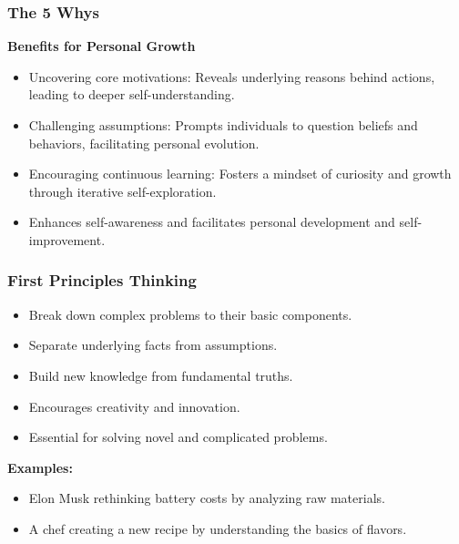 \begin{frame}[fragile]\frametitle{The 5 Whys}
\textbf{Benefits for Personal Growth}
\begin{itemize}
    \item Uncovering core motivations: Reveals underlying reasons behind actions, leading to deeper self-understanding.
    \item Challenging assumptions: Prompts individuals to question beliefs and behaviors, facilitating personal evolution.
    \item Encouraging continuous learning: Fosters a mindset of curiosity and growth through iterative self-exploration.
    \item Enhances self-awareness and facilitates personal development and self-improvement.
\end{itemize}
\end{frame}

\begin{frame}[fragile]\frametitle{First Principles Thinking}
\begin{itemize}
    \item Break down complex problems to their basic components.
    \item Separate underlying facts from assumptions.
    \item Build new knowledge from fundamental truths.
    \item Encourages creativity and innovation.
    \item Essential for solving novel and complicated problems.
\end{itemize}
\textbf{Examples:}
\begin{itemize}
    \item Elon Musk rethinking battery costs by analyzing raw materials.
    \item A chef creating a new recipe by understanding the basics of flavors.
\end{itemize}
\end{frame}

